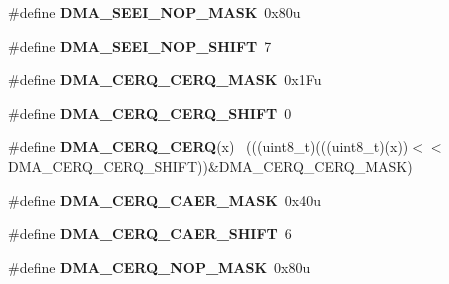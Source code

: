 \begin{DoxyCompactItemize}
\item 
\hypertarget{group___d_m_a___register___masks_ga4561a1738dbf8013bd619fad65b0e216}{}\#define {\bfseries D\+M\+A\+\_\+\+S\+E\+E\+I\+\_\+\+N\+O\+P\+\_\+\+M\+A\+S\+K}~0x80u\label{group___d_m_a___register___masks_ga4561a1738dbf8013bd619fad65b0e216}

\item 
\hypertarget{group___d_m_a___register___masks_ga190051f9e53699e081f1b6f96f6890c8}{}\#define {\bfseries D\+M\+A\+\_\+\+S\+E\+E\+I\+\_\+\+N\+O\+P\+\_\+\+S\+H\+I\+F\+T}~7\label{group___d_m_a___register___masks_ga190051f9e53699e081f1b6f96f6890c8}

\item 
\hypertarget{group___d_m_a___register___masks_ga6c4e980f82778e0191670788d29dcb9e}{}\#define {\bfseries D\+M\+A\+\_\+\+C\+E\+R\+Q\+\_\+\+C\+E\+R\+Q\+\_\+\+M\+A\+S\+K}~0x1\+Fu\label{group___d_m_a___register___masks_ga6c4e980f82778e0191670788d29dcb9e}

\item 
\hypertarget{group___d_m_a___register___masks_gaca402b011bea1924acca0e1e708c6db6}{}\#define {\bfseries D\+M\+A\+\_\+\+C\+E\+R\+Q\+\_\+\+C\+E\+R\+Q\+\_\+\+S\+H\+I\+F\+T}~0\label{group___d_m_a___register___masks_gaca402b011bea1924acca0e1e708c6db6}

\item 
\hypertarget{group___d_m_a___register___masks_gadeca3781851e47cdfc6ee31093595e3b}{}\#define {\bfseries D\+M\+A\+\_\+\+C\+E\+R\+Q\+\_\+\+C\+E\+R\+Q}(x)                                              ~(((uint8\+\_\+t)(((uint8\+\_\+t)(x))$<$$<$D\+M\+A\+\_\+\+C\+E\+R\+Q\+\_\+\+C\+E\+R\+Q\+\_\+\+S\+H\+I\+F\+T))\&D\+M\+A\+\_\+\+C\+E\+R\+Q\+\_\+\+C\+E\+R\+Q\+\_\+\+M\+A\+S\+K)\label{group___d_m_a___register___masks_gadeca3781851e47cdfc6ee31093595e3b}

\item 
\hypertarget{group___d_m_a___register___masks_ga17f24999dd91f4ddc8f10ec2927da85b}{}\#define {\bfseries D\+M\+A\+\_\+\+C\+E\+R\+Q\+\_\+\+C\+A\+E\+R\+\_\+\+M\+A\+S\+K}~0x40u\label{group___d_m_a___register___masks_ga17f24999dd91f4ddc8f10ec2927da85b}

\item 
\hypertarget{group___d_m_a___register___masks_ga8a6482d87d17b4fec19e2fd984323f54}{}\#define {\bfseries D\+M\+A\+\_\+\+C\+E\+R\+Q\+\_\+\+C\+A\+E\+R\+\_\+\+S\+H\+I\+F\+T}~6\label{group___d_m_a___register___masks_ga8a6482d87d17b4fec19e2fd984323f54}

\item 
\hypertarget{group___d_m_a___register___masks_gae8c0c81a0c9cfc2e2bd4aaa42ee5b204}{}\#define {\bfseries D\+M\+A\+\_\+\+C\+E\+R\+Q\+\_\+\+N\+O\+P\+\_\+\+M\+A\+S\+K}~0x80u\label{group___d_m_a___register___masks_gae8c0c81a0c9cfc2e2bd4aaa42ee5b204}


\end{DoxyCompactItemize}
